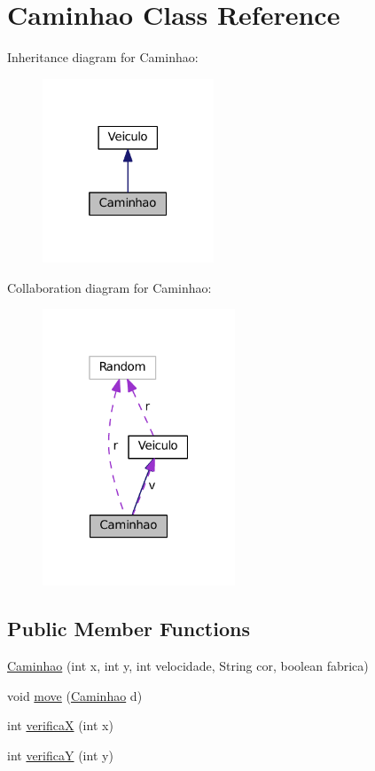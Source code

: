 \hypertarget{classCaminhao}{}\section{Caminhao Class Reference}
\label{classCaminhao}


Inheritance diagram for Caminhao\+:\nopagebreak
\begin{figure}[H]
\begin{center}
\leavevmode
\includegraphics[width=145pt]{classCaminhao__inherit__graph}
\end{center}
\end{figure}


Collaboration diagram for Caminhao\+:\nopagebreak
\begin{figure}[H]
\begin{center}
\leavevmode
\includegraphics[width=163pt]{classCaminhao__coll__graph}
\end{center}
\end{figure}
\subsection*{Public Member Functions}
\begin{DoxyCompactItemize}
\item 
\hyperlink{classCaminhao_a4f1abc58ca9a7e48ab56505a553733bb}{Caminhao} (int x, int y, int velocidade, String cor, boolean fabrica)
\item 
void \hyperlink{classCaminhao_ad5c349085ca9b79dd22f9d230205dd9d}{move} (\hyperlink{classCaminhao}{Caminhao} d)
\item 
int \hyperlink{classCaminhao_a42fe92db1834d785615a48b6a996ab51}{verificaX} (int x)
\item 
int \hyperlink{classCaminhao_a71435d7d443cf69b29ae66d35e346904}{verificaY} (int y)
\end{DoxyCompactItemize}


